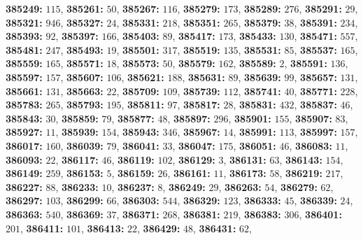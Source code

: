 \textsf{\bfseries 385249:} $115$, \textsf{\bfseries 385261:} $50$, \textsf{\bfseries 385267:} $116$, \textsf{\bfseries 385279:} $173$, \textsf{\bfseries 385289:} $276$, \textsf{\bfseries 385291:} $29$, \textsf{\bfseries 385321:} $946$, \textsf{\bfseries 385327:} $24$, \textsf{\bfseries 385331:} $218$, \textsf{\bfseries 385351:} $265$, \textsf{\bfseries 385379:} $38$, \textsf{\bfseries 385391:} $234$, \textsf{\bfseries 385393:} $92$, \textsf{\bfseries 385397:} $166$, \textsf{\bfseries 385403:} $89$, \textsf{\bfseries 385417:} $173$, \textsf{\bfseries 385433:} $130$, \textsf{\bfseries 385471:} $557$, \textsf{\bfseries 385481:} $247$, \textsf{\bfseries 385493:} $19$, \textsf{\bfseries 385501:} $317$, \textsf{\bfseries 385519:} $135$, \textsf{\bfseries 385531:} $85$, \textsf{\bfseries 385537:} $165$, \textsf{\bfseries 385559:} $165$, \textsf{\bfseries 385571:} $18$, \textsf{\bfseries 385573:} $50$, \textsf{\bfseries 385579:} $162$, \textsf{\bfseries 385589:} $2$, \textsf{\bfseries 385591:} $136$, \textsf{\bfseries 385597:} $157$, \textsf{\bfseries 385607:} $106$, \textsf{\bfseries 385621:} $188$, \textsf{\bfseries 385631:} $89$, \textsf{\bfseries 385639:} $99$, \textsf{\bfseries 385657:} $131$, \textsf{\bfseries 385661:} $131$, \textsf{\bfseries 385663:} $22$, \textsf{\bfseries 385709:} $109$, \textsf{\bfseries 385739:} $112$, \textsf{\bfseries 385741:} $40$, \textsf{\bfseries 385771:} $228$, \textsf{\bfseries 385783:} $265$, \textsf{\bfseries 385793:} $195$, \textsf{\bfseries 385811:} $97$, \textsf{\bfseries 385817:} $28$, \textsf{\bfseries 385831:} $432$, \textsf{\bfseries 385837:} $46$, \textsf{\bfseries 385843:} $30$, \textsf{\bfseries 385859:} $79$, \textsf{\bfseries 385877:} $48$, \textsf{\bfseries 385897:} $296$, \textsf{\bfseries 385901:} $155$, \textsf{\bfseries 385907:} $83$, \textsf{\bfseries 385927:} $11$, \textsf{\bfseries 385939:} $154$, \textsf{\bfseries 385943:} $346$, \textsf{\bfseries 385967:} $14$, \textsf{\bfseries 385991:} $113$, \textsf{\bfseries 385997:} $157$, \textsf{\bfseries 386017:} $160$, \textsf{\bfseries 386039:} $79$, \textsf{\bfseries 386041:} $33$, \textsf{\bfseries 386047:} $175$, \textsf{\bfseries 386051:} $46$, \textsf{\bfseries 386083:} $11$, \textsf{\bfseries 386093:} $22$, \textsf{\bfseries 386117:} $46$, \textsf{\bfseries 386119:} $102$, \textsf{\bfseries 386129:} $3$, \textsf{\bfseries 386131:} $63$, \textsf{\bfseries 386143:} $154$, \textsf{\bfseries 386149:} $259$, \textsf{\bfseries 386153:} $5$, \textsf{\bfseries 386159:} $26$, \textsf{\bfseries 386161:} $11$, \textsf{\bfseries 386173:} $58$, \textsf{\bfseries 386219:} $217$, \textsf{\bfseries 386227:} $88$, \textsf{\bfseries 386233:} $10$, \textsf{\bfseries 386237:} $8$, \textsf{\bfseries 386249:} $29$, \textsf{\bfseries 386263:} $54$, \textsf{\bfseries 386279:} $62$, \textsf{\bfseries 386297:} $103$, \textsf{\bfseries 386299:} $66$, \textsf{\bfseries 386303:} $544$, \textsf{\bfseries 386329:} $123$, \textsf{\bfseries 386333:} $45$, \textsf{\bfseries 386339:} $24$, \textsf{\bfseries 386363:} $540$, \textsf{\bfseries 386369:} $37$, \textsf{\bfseries 386371:} $268$, \textsf{\bfseries 386381:} $219$, \textsf{\bfseries 386383:} $306$, \textsf{\bfseries 386401:} $201$, \textsf{\bfseries 386411:} $101$, \textsf{\bfseries 386413:} $22$, \textsf{\bfseries 386429:} $48$, \textsf{\bfseries 386431:} $62$, 
